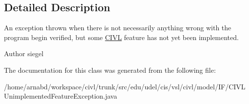 \subsection{Detailed Description}
An exception thrown when there is not necessarily anything wrong with the program begin verified, but some \hyperlink{classedu_1_1udel_1_1cis_1_1vsl_1_1civl_1_1CIVL}{C\+I\+V\+L} feature has not yet been implemented. 

\begin{DoxyAuthor}{Author}
siegel 
\end{DoxyAuthor}


The documentation for this class was generated from the following file\+:\begin{DoxyCompactItemize}
\item 
/home/arnabd/workspace/civl/trunk/src/edu/udel/cis/vsl/civl/model/\+I\+F/C\+I\+V\+L\+Unimplemented\+Feature\+Exception.\+java\end{DoxyCompactItemize}
